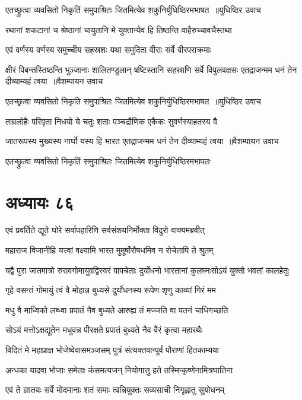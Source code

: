 \twolineshloka
{एतच्छ्रुत्वा व्यवसितो निकृतिं समुपाश्रितः}
{जितमित्येव शकुनिर्युधिष्ठिरमभाषत ॥युधिष्ठिर उवाच}


\twolineshloka
{रथानां शकटानां च श्रेष्ठानां चायुतानि मे}
{युक्तान्येव हि तिष्ठन्ति वाहैरुच्चावचैस्तथा}


\twolineshloka
{एवं वर्णस्य वर्णस्य समुच्चीय सहस्रशः}
{यथा समुदिता वीराः सर्वे वीरपराक्रमाः}


\threelineshloka
{क्षीरं पिबन्तस्तिष्ठन्ति भुञ्जानाः शालितण्डुलान्}
{षष्टिस्तानि सहस्राणि सर्वे विपुलवक्षसः}
{एतद्राजन्मम धनं तेन दीव्याम्यहं त्वया ॥वैशम्पायन उवाच}


\threelineshloka
{एतच्छ्रत्वा व्यवसितो निकृति समुपाश्रितः}
{जितमित्येव शकुनिर्युधिष्ठिरमभाषत ॥युधिष्ठिर उवाच}
{}


\twolineshloka
{ताम्रलोहैः परिवृता निधयो ये चतुः शताः}
{पञ्चद्रौणिक एकैकः सुवर्णस्याहतस्य वै}


\twolineshloka
{जातरूपस्य मुख्यस्य नार्घो यस्य हि भारत}
{एतद्राजन्मम धनं तेन दीव्याम्यहं त्वया ॥वैशम्पायन उवाच}


\twolineshloka
{एतच्छ्रुत्वा व्यवसितो निकृतिं समुपाश्रितः}
{जितमित्येव शकुनिर्युधिष्ठिरमभापतः}


\chapter{अध्यायः ८६}
\twolineshloka
{एवं प्रवर्तिते द्यूते घोरे सर्वापहारिणि}
{सर्वसंशयनिर्मोक्ता विदुरो वाक्यमब्रवीत्}


\twolineshloka
{महाराज विजानीहि यत्त्वां वक्ष्यामि भारत}
{मुमूर्षोरौषधमिव न रोचेतापि ते श्रुतम्}


\twolineshloka
{यद्वै पुरा जातमात्रो रुरावगोमायुवद्विस्वरं पापचेताः}
{दुर्योधनो भारतानां कुलघ्नःसोऽयं युक्तो भवतां कालहेतुः}


\twolineshloka
{गृहे वसन्तं गोमायुं त्वं वै मोहान्न बुध्यसे}
{दुर्योधनस्य रूपेण शृणु काव्यां गिरं मम}


\twolineshloka
{मधु वै माध्विको लब्ध्वा प्रपातं नैव बुध्यते}
{आरुह्य तं मज्जति वा पतनं चाधिगच्छति}


\twolineshloka
{सोऽयं मत्तोऽक्षद्यूतेन मधुवन्न पीरक्षते}
{प्रपातं बुध्यते नैव वैरं कृत्वा महारथैः}


\twolineshloka
{विदितं मे महाप्राज्ञ भोजेष्वेवासमञ्जसम्}
{पुत्रं संत्यक्तवान्पूर्वं पौराणां हितकाम्यया}


\twolineshloka
{अन्धका यादवा भोजाः समेताः कंसमत्यजन्}
{नियोगात्तु हते तस्मिन्कृष्णेनामित्रघातिना}


\twolineshloka
{एवं ते ज्ञातयः सर्वे मोदमानाः शतं समाः}
{त्वन्नियुक्तः सव्यसाची निगृह्णातु सुयोधनम्}



